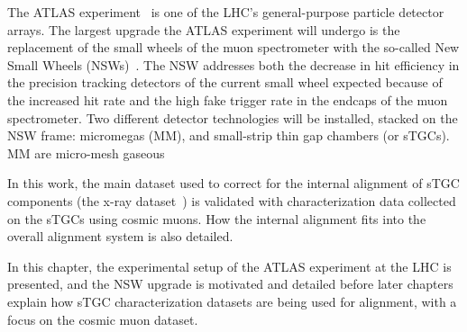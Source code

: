 The ATLAS experiment~\cite{collaboration_atlas_2008} is one of the LHC's general-purpose particle detector arrays. The largest upgrade the ATLAS experiment will undergo is the replacement of the small wheels of the muon spectrometer with the so-called New Small Wheels (NSWs)~\cite{nsw_tdr}. The NSW addresses both the decrease in hit efficiency in the precision tracking detectors of the current small wheel expected because of the increased hit rate and the high fake trigger rate in the endcaps of the muon spectrometer. Two different detector technologies will be installed, stacked on the NSW frame: micromegas (MM), and small-strip thin gap chambers (or sTGCs). MM are micro-mesh gaseous

In this work, the main dataset used to correct for the internal alignment of sTGC components (the x-ray dataset~\cite{lefebvre_precision_2020}) is validated with characterization data collected on the sTGCs using cosmic muons. How the internal alignment fits into the overall alignment system is also detailed. 

In this chapter, the experimental setup of the ATLAS experiment at the LHC is presented, and the NSW upgrade is motivated and detailed before later chapters explain how sTGC characterization datasets are being used for alignment, with a focus on the cosmic muon dataset.
